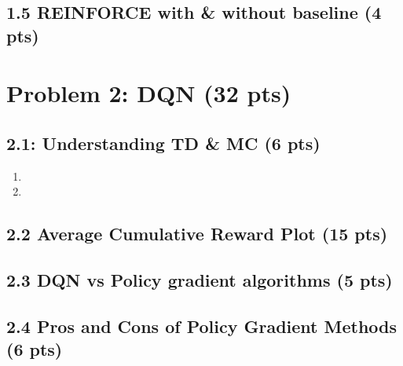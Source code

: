 \documentclass[12pt]{article}
\begin{document}
\subsection*{1.5 REINFORCE with \& without baseline (4 pts)}
\begin{solution}[height=5cm]
\end{solution}



\newpage
\section*{Problem 2: DQN (32 pts)}

\subsection*{2.1: Understanding TD \& MC (6 pts)}
\begin{solution}[height=6cm]
\begin{enumerate}
    \item 
    \item 
\end{enumerate}
\end{solution}

\subsection*{2.2 Average Cumulative Reward Plot (15 pts)}
\begin{solution}[height=12cm]
\end{solution}



\subsection*{2.3 DQN vs Policy gradient algorithms (5 pts)}
\begin{solution}[height=5cm]
\end{solution}

\subsection*{2.4 Pros and Cons of Policy Gradient Methods (6 pts)}
\begin{solution}[height=5cm]
\end{solution}
\end{document}
